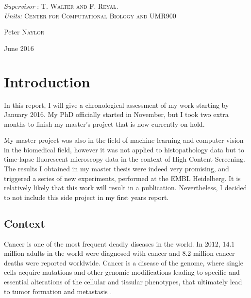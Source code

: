 \documentclass[a4paper,10pt]{article}
\begin{document}
\begin{titlepage}
   \begin{center}  \large
\textit{Supervisor} : \textsc{T. Walter and F. Reyal}. \\
\textit{Units:} \textsc{Center for Computational Biology and UMR900}

   \end{center}
     
  \begin{center} \Large
  Peter \textsc{Naylor}
  \end{center}


  \begin{center}  \large
    June 2016
  \end{center}

\end{titlepage}




\newpage
\tableofcontents
\newpage

\section{Introduction}

In this report, I will give a chronological assessment of my work starting by
 January 2016. My PhD officially started in November, but I took
 two extra months to finish my master's project that is now currently
 on hold. 

My master project was also in the field of machine
 learning and computer vision in the biomedical field, however it was not applied to
 histopathology data but to time-lapse fluorescent microscopy
 data in the context of High Content Screening. The results I 
 obtained in my master thesis were indeed very promising, and triggered
 a series of new experiments, performed at the EMBL Heidelberg. It is
 relatively likely that this work will result in a
 publication. Nevertheless, I decided to not include this side project
 in my first years report.


\subsection{Context}
Cancer is one of the most frequent deadly diseases in the world. In
2012, 14.1 million adults in the world were diagnosed with cancer and
8.2 million cancer deaths were reported worldwide. Cancer is a disease
of the genome, where single cells acquire mutations and other genomic
modifications leading to
specific and essential alterations of the cellular and tissular
phenotypes, that ultimately lead to tumor formation and metastasis
\citep{Hanahan2000,Hanahan2011}. 
\end{document}
